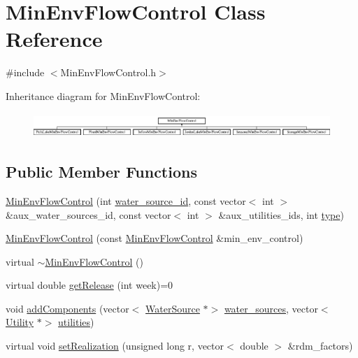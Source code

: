 \hypertarget{classMinEnvFlowControl}{}\section{Min\+Env\+Flow\+Control Class Reference}
\label{classMinEnvFlowControl}


{\ttfamily \#include $<$Min\+Env\+Flow\+Control.\+h$>$}

Inheritance diagram for Min\+Env\+Flow\+Control\+:\begin{figure}[H]
\begin{center}
\leavevmode
\includegraphics[height=0.942761cm]{classMinEnvFlowControl}
\end{center}
\end{figure}
\subsection*{Public Member Functions}
\begin{DoxyCompactItemize}
\item 
\mbox{\hyperlink{classMinEnvFlowControl_a093b292294d85f426c38deb6b7537d81_a093b292294d85f426c38deb6b7537d81}{Min\+Env\+Flow\+Control}} (int \mbox{\hyperlink{classMinEnvFlowControl_aada518a047598f386daec1d0358023aa_aada518a047598f386daec1d0358023aa}{water\+\_\+source\+\_\+id}}, const vector$<$ int $>$ \&aux\+\_\+water\+\_\+sources\+\_\+id, const vector$<$ int $>$ \&aux\+\_\+utilities\+\_\+ids, int \mbox{\hyperlink{classMinEnvFlowControl_abc3f168cd1ec36ba59e4b8604dfae8ec_abc3f168cd1ec36ba59e4b8604dfae8ec}{type}})
\item 
\mbox{\hyperlink{classMinEnvFlowControl_a0e12d2b8583a539d200acfc5fac795b6_a0e12d2b8583a539d200acfc5fac795b6}{Min\+Env\+Flow\+Control}} (const \mbox{\hyperlink{classMinEnvFlowControl}{Min\+Env\+Flow\+Control}} \&min\+\_\+env\+\_\+control)
\item 
virtual \mbox{\hyperlink{classMinEnvFlowControl_a809d1552ea730c607dbc73937eb70a6a_a809d1552ea730c607dbc73937eb70a6a}{$\sim$\+Min\+Env\+Flow\+Control}} ()
\item 
virtual double \mbox{\hyperlink{classMinEnvFlowControl_a5de79615852eb0c937dd559a9eb9402d_a5de79615852eb0c937dd559a9eb9402d}{get\+Release}} (int week)=0
\item 
void \mbox{\hyperlink{classMinEnvFlowControl_a4f849e1385f68c9d8f2835889f14a71f_a4f849e1385f68c9d8f2835889f14a71f}{add\+Components}} (vector$<$ \mbox{\hyperlink{classWaterSource}{Water\+Source}} $\ast$$>$ \mbox{\hyperlink{classMinEnvFlowControl_a36b50d0e6887b956051ae53bf5d2e3a9_a36b50d0e6887b956051ae53bf5d2e3a9}{water\+\_\+sources}}, vector$<$ \mbox{\hyperlink{classUtility}{Utility}} $\ast$$>$ \mbox{\hyperlink{classMinEnvFlowControl_a1a0a309138b35e8199c205efb5fb5f80_a1a0a309138b35e8199c205efb5fb5f80}{utilities}})
\item 
virtual void \mbox{\hyperlink{classMinEnvFlowControl_aff9774bd700410f9cd9a04e323f824c8_aff9774bd700410f9cd9a04e323f824c8}{set\+Realization}} (unsigned long r, vector$<$ double $>$ \&rdm\+\_\+factors)
\end{DoxyCompactItemize}
